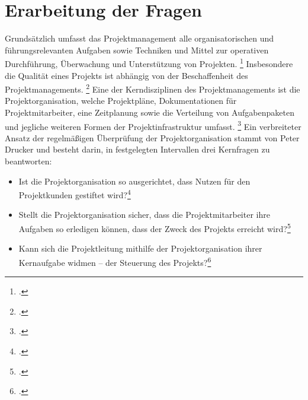 \chapter{Erarbeitung der Fragen}
Grundsätzlich umfasst das Projektmanagement alle organisatorischen und führungsrelevanten Aufgaben
sowie Techniken und Mittel zur operativen Durchführung, Überwachung und
Unterstützung von Projekten.
\footcite[Vgl.][3]{holzbaurNachhaltigesProjektmanagementVerantwortlichkeit2022}
Insbesondere die Qualität eines Projekts ist abhängig
von der Beschaffenheit des Projektmanagements.
\footcite[Vgl.][52]{stoegerWirksamesProjektmanagementMit2019}
Eine der Kerndisziplinen des
Projektmanagements ist die Projektorganisation, welche Projektpläne,
Dokumentationen für Projektmitarbeiter, eine Zeitplanung sowie
die Verteilung von Aufgabenpaketen und jegliche weiteren Formen der
Projektinfrastruktur umfasst.
\footcite[Vgl.][53]{stoegerWirksamesProjektmanagementMit2019}
Ein verbreiteter Ansatz der regelmäßigen Überprüfung der Projektorganisation
stammt von Peter Drucker und besteht darin, in festgelegten Intervallen
drei Kernfragen zu beantworten:
\begin{itemize}
    \item Ist die Projektorganisation so ausgerichtet, dass Nutzen für den Projektkunden gestiftet wird?\footcite[][57]{stoegerWirksamesProjektmanagementMit2019}
    \item Stellt die Projektorganisation sicher, dass die Projektmitarbeiter ihre Aufgaben so erledigen können, dass der Zweck des Projekts erreicht wird?\footcite[][57]{stoegerWirksamesProjektmanagementMit2019}
    \item Kann sich die Projektleitung mithilfe der Projektorganisation ihrer Kernaufgabe widmen – der Steuerung des Projekts?\footcite[][57]{stoegerWirksamesProjektmanagementMit2019}
\end{itemize}
